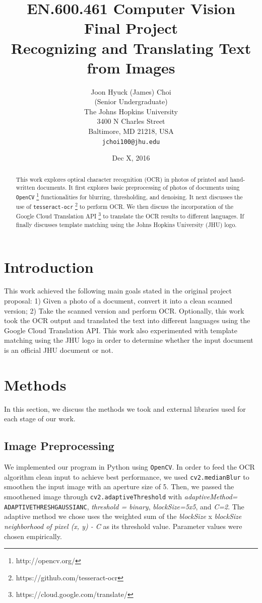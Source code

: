 \documentclass[11pt,letterpaper]{article}
\title{EN.600.461 Computer Vision\\Final Project\\Recognizing and Translating Text from Images}
\author{Joon Hyuck (James) Choi\\
  (Senior Undergraduate)\\
  The Johns Hopkins University\\
  3400 N Charles Street\\
  Baltimore, MD 21218, USA\\
  {\tt jchoi100@jhu.edu}}
\date{Dec X, 2016}
\begin{document}
\maketitle
\begin{abstract}
  This work explores optical character recognition (OCR) in photos of printed and hand-written documents. It first explores basic preprocessing of photos of documents using {\tt OpenCV} \footnote{http://opencv.org/} functionalities for blurring, thresholding, and denoising. It next discusses the use of {\tt tesseract-ocr} \footnote{https://github.com/tesseract-ocr} to perform OCR. We then discuss the incorporation of the Google Cloud Translation API \footnote{https://cloud.google.com/translate/} to translate the OCR results to different languages. If finally discusses template matching using the Johns Hopkins University (JHU) logo. 
\end{abstract}

\section{Introduction}

This work achieved the following main goals stated in the original project proposal: 1) Given a photo of a document, convert it into a clean scanned version; 2) Take the scanned version and perform OCR. Optionally, this work took the OCR output and translated the text into different languages using the Google Cloud Translation API. This work also experimented with template matching using the JHU logo in order to determine whether the input document is an official JHU document or not.

\section{Methods}

In this section, we discuss the methods we took and external libraries used for each stage of our work.

\subsection{Image Preprocessing}

We implemented our program in Python using {\tt OpenCV}. In order to feed the OCR algorithm clean input to achieve best performance, we used {\tt cv2.medianBlur} to smoothen the input image with an aperture size of 5. Then, we passed the smoothened image through {\tt cv2.adaptiveThreshold} with \textit{adaptiveMethod=} {\tt ADAPTIVE\textunderscore THRESH\textunderscore GAUSSIAN\textunderscore C}, \textit{threshold = binary}, \textit{blockSize=5x5}, and \textit{C=2}. The adaptive method we chose uses the weighted sum of the \textit{blockSize} x \textit{blockSize neighborhood of pixel (x, y) - C} as its threshold value. Parameter values were chosen empirically.
\end{document}
